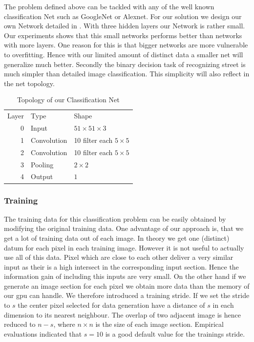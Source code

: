 The problem defined above can be tackled with any of the well known classification Net such as GoogleNet or Alexnet. For our solution we design our own Network detailed in . With three hidden layers our Network is rather small. Our experiments shows that this small networks performs better than networks with more layers. One reason for this is that bigger networks are more vulnerable to overfitting. Hence with our limited amount of distinct data a smaller net will generalize much better. Secondly the binary decision task of recognizing street is much simpler than detailed image classification. This simplicity will also reflect in the net topology.

\begin{table}[H]
	\normalsize
	\centering
\begin{tabular}{r l l}
	Layer & Type  & Shape  \\
	0     & Input &  $51 \times 51 \times 3$ \\
	1     & Convolution & 10 filter  each $5 \times 5$ \\
	2     & Convolution & 10 filter  each $5 \times 5$  \\
	3     & Pooling     & $2 \times 2$ \\
	4     & Output     & $1$ \\
\end{tabular}
\caption{Topology of our Classification Net}
\label{tab:topo}
\end{table} 

\subsubsection{Training}

The training data for this classification problem can be easily obtained by modifying the original training data. One advantage of our approach is, that we get a lot of training data out of each image. In theory we get one (distinct) datum for each pixel in each training image. However it is not useful to actually use all of this data. Pixel which are close to each other deliver a very similar input as their is a high intersect in the corresponding input section. Hence the information gain of including this inputs are very small. On the other hand if we generate an image section for each pixel we obtain more data than the memory of our gpu can handle. We therefore introduced a training stride. If we set the stride to $s$ the center pixel selected for data generation have a distance of $s$ in each dimension to its nearest neighbour. The overlap of two adjacent image is hence reduced to $n-s$, where $n \times n$ is the size of each image section. Empirical evaluations indicated that $s=10$ is a good default value for the trainings stride.



